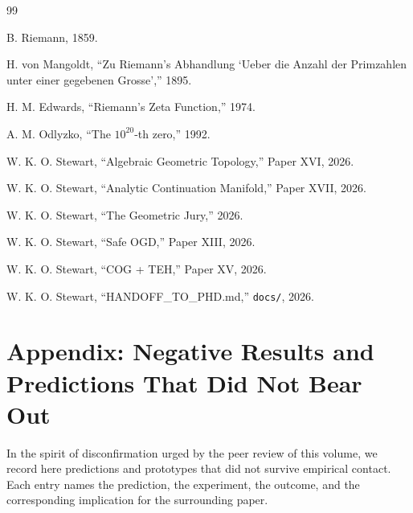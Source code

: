 \documentclass[11pt]{article}
\begin{document}
\clearpage
\begin{thebibliography}{99}

 B. Riemann, 1859.

 H. von Mangoldt, ``Zu Riemann's Abhandlung `Ueber die Anzahl der Primzahlen unter einer gegebenen Grosse','' 1895.

 H. M. Edwards, ``Riemann's Zeta Function,'' 1974.

 A. M. Odlyzko, ``The $10^{20}$-th zero,'' 1992.

 W. K. O. Stewart, ``Algebraic Geometric Topology,'' Paper XVI, 2026.

 W. K. O. Stewart, ``Analytic Continuation Manifold,'' Paper XVII, 2026.

 W. K. O. Stewart, ``The Geometric Jury,'' 2026.

 W. K. O. Stewart, ``Safe OGD,'' Paper XIII, 2026.

 W. K. O. Stewart, ``COG + TEH,'' Paper XV, 2026.

 W. K. O. Stewart, ``HANDOFF\_TO\_PHD.md,'' \texttt{docs/}, 2026.

\end{thebibliography}

\newpage


% 
% 

\printbibliography

\section*{Appendix: Negative Results and Predictions That Did Not Bear Out}
In the spirit of disconfirmation urged by the peer review of this volume, we record here predictions and prototypes that did not survive empirical contact. Each entry names the prediction, the experiment, the outcome, and the corresponding implication for the surrounding paper.
\end{document}

